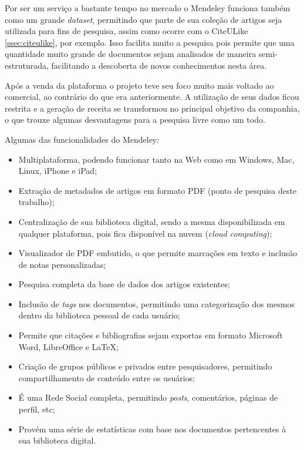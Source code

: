 \begin{textnew}
Por ser um serviço a bastante tempo no mercado o Mendeley funciona também como um grande \emph{dataset}, permitindo que parte de sua coleção de artigos seja utilizada para fins de pesquisa, assim como ocorre com o CiteULike \autoref{ssec:citeulike}, por exemplo. Isso facilita muito a pesquisa pois permite que uma quantidade muito grande de documentos sejam analisados de maneira semi-estruturada, facilitando a descoberta de novos conhecimentos nesta área.

Após a venda da plataforma o projeto teve seu foco muito mais voltado ao comercial, ao contrário do que era anteriormente. A utilização de seus dados ficou restrita e a geração de receita se transformou no principal objetivo da companhia, o que trouxe algumas desvantagens para a pesquisa livre como um todo.

Algumas das funcionalidades do Mendeley:

\begin{itemize}
    \item Multiplataforma, podendo funcionar tanto na Web como em Windows, Mac, Linux, iPhone e iPad;
    \item Extração de metadados de artigos em formato PDF (ponto de pesquisa deste trabalho);
    \item Centralização de sua biblioteca digital, sendo a mesma disponibilizada em qualquer plataforma, pois fica disponível na nuvem (\emph{cloud computing});
    \item Visualizador de PDF embutido, o que permite marcações em texto e inclusão de notas personalizadas;
    \item Pesquisa completa da base de dados dos artigos existentes;
    \item Inclusão de \emph{tags} nos documentos, permitindo uma categorização dos mesmos dentro da biblioteca pessoal de cada usuário;
    \item Permite que citações e bibliografias sejam exportas em formato Microsoft Word, LibreOffice e \LaTeX;
    \item Criação de grupos públicos e privados entre pesquisadores, permitindo compartilhamento de conteúdo entre os usuários;
    \item É uma Rede Social completa, permitindo \emph{posts}, comentários, páginas de perfil, etc;
    \item Provém uma série de estatísticas com base nos documentos pertencentes à sua biblioteca digital.
\end{itemize}



\end{textnew}
